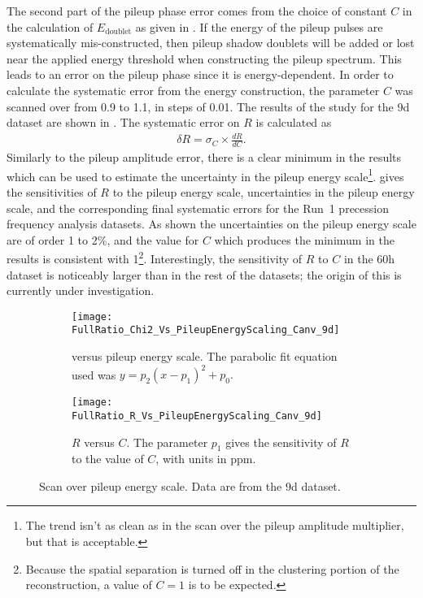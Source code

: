 The second part of the pileup phase error comes from the choice of constant $C$ in the calculation of $E_{\text{doublet}}$ as given in . If the energy of the pileup pulses are systematically mis-constructed, then pileup shadow doublets will be added or lost near the applied energy threshold when constructing the pileup spectrum. This leads to an error on the pileup phase since it is energy-dependent. In order to calculate the systematic error from the energy construction, the parameter $C$ was scanned over from 0.9 to 1.1, in steps of 0.01. The results of the study for the 9d dataset are shown in . The systematic error on $R$ is calculated as 
    \begin{align}
        \delta R = \sigma_{C} \times \frac{dR}{dC}.
    \end{align}
Similarly to the pileup amplitude error, there is a clear minimum in the \chisq results which can be used to estimate the uncertainty in the pileup energy scale\footnote{The trend isn't as clean as in the scan over the pileup amplitude multiplier, but that is acceptable.}.  gives the sensitivities of $R$ to the pileup energy scale, uncertainties in the pileup energy scale, and the corresponding final systematic errors for the Run~1 precession frequency analysis datasets. As shown the uncertainties on the pileup energy scale are of order 1 to 2\%, and the value for $C$ which produces the minimum in the \chisq results is consistent with 1\footnote{Because the spatial separation is turned off in the clustering portion of the reconstruction, a value of $C = 1$ is to be expected.}. Interestingly, the sensitivity of $R$ to $C$ in the 60h dataset is noticeably larger than in the rest of the datasets; the origin of this is currently under investigation.


\begin{figure}
\centering
    \begin{subfigure}[t]{0.45\textwidth}
        \centering
        \texttt{[image: FullRatio\_Chi2\_Vs\_PileupEnergyScaling\_Canv\_9d]}
        \caption{\chisq versus pileup energy scale. The parabolic fit equation used was $y = p_{2}(x - p_{1})^{2} + p_{0}.$}
    \end{subfigure}%
    \hspace{1cm}
    \begin{subfigure}[t]{0.45\textwidth}
        \centering
        \texttt{[image: FullRatio\_R\_Vs\_PileupEnergyScaling\_Canv\_9d]}
        \caption{$R$ versus $C$. The parameter $p_{1}$ gives the sensitivity of $R$ to the value of $C$, with units in ppm.}
    \end{subfigure}
\caption[Pileup energy scale scan]{Scan over pileup energy scale. Data are from the 9d dataset.}
\label{fig:PEscan}
\end{figure}


